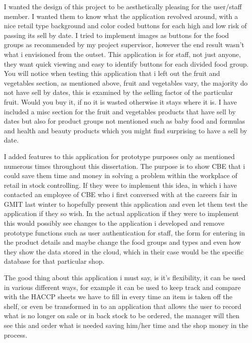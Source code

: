 I wanted the design of this project to be aesthetically pleasing for the user/staff member. I wanted them to know what the application revolved around, with a nice retail type background and color coded buttons for each high and low risk of passing its sell by date. I tried to implement images as buttons for the food groups as recommended by my project supervisor, however the end result wasn't what i envisioned from the outset. This application is for staff, not just anyone, they want quick viewing and easy to identify buttons for each divided food group. You will notice when testing this application that i left out the fruit and vegetables section, as mentioned above, fruit and vegetables vary, the majority do not have sell by dates, this is examined by the selling factor of the particular fruit. Would you buy it, if no it is wasted otherwise it stays where it is. I have included a misc section for the fruit and vegetables products that have sell by dates but also for product groups not mentioned such as baby food and formulas and health and beauty products which you might find surprising to have a sell by date.
\newline

I added features to this application for prototype purposes only as mentioned numerous times throughout this dissertation. The purpose is to show CBE that i could save them time and money in solving a problem within the workplace of retail in stock controlling. If they were to implement this idea, in which i have contacted an employee of CBE who i first conversed with at the careers fair in GMIT last winter to hopefully present this application and even let them test the application if they so wish. In the actual application if they were to implement this would possibly see changes to the application i developed and remove prototype functions such as user authentication for staff, the form for entering in the product details and maybe change the food groups and types and even how they show the data stored in the cloud, which in their case would be the specific database for that particular shop. 
\newline 

The good thing about this application i must say, is it's flexibility, it can be used in various different ways, for example it can be used to keep track and compare with the HACCP sheets we have to fill in every time an item is taken off the shelf, or even be transformed in to an application that allows the user to record what is no longer on sale or in back stock to be ordered, the manager will then see this and order what is needed saving him/her time and the shop money in the process.

